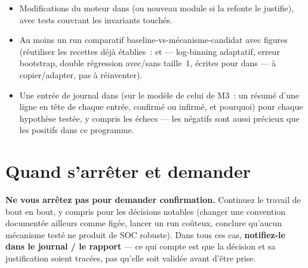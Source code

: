 \begin{itemize}[leftmargin=*]
  \item Modifications du moteur dans  (ou nouveau module si
    la refonte le justifie), avec tests couvrant les invariants touchés.
  \item Au moins un run comparatif baseline-vs-mécanisme-candidat avec
    figures (réutiliser les recettes déjà établies~:
     et  —
    log-binning adaptatif, erreur bootstrap, double régression avec/sans
    taille~1, écrites pour  dans
     — à copier/adapter, pas à réinventer).
  \item Une entrée de journal dans  (sur le
    modèle de celui de M3~: un résumé d'une ligne en tête de chaque entrée,
    confirmé ou infirmé, et pourquoi) pour chaque hypothèse testée, y
    compris les échecs — les négatifs sont aussi précieux que les positifs
    dans ce programme.
\end{itemize}

\section*{Quand s'arrêter et demander}

\textbf{Ne vous arrêtez pas pour demander confirmation.} Continuez le
travail de bout en bout, y compris pour les décisions notables (changer une
convention documentée ailleurs comme figée, lancer un run coûteux, conclure
qu'aucun mécanisme testé ne produit de SOC robuste). Dans tous ces cas,
\textbf{notifiez-le dans le journal / le rapport} — ce qui compte est que la
décision et sa justification soient tracées, pas qu'elle soit validée avant
d'être prise.

